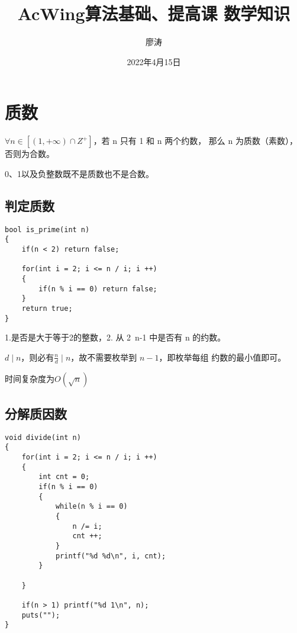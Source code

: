 \documentclass[]{book}
\title{AcWing算法基础、提高课 数学知识}
\author{廖涛}
\date{2022年4月15日}
\begin{document}


\maketitle
\tableofcontents

\chapter{质数}
$\forall n\in [(1, +\infty) \cap Z^+]$，若 n 只有 1 和 n 两个约数，
那么 n 为质数（素数），否则为合数。

0、1以及负整数既不是质数也不是合数。

\section{判定质数}
\begin{lstlisting}
bool is_prime(int n)
{
    if(n < 2) return false;

    for(int i = 2; i <= n / i; i ++)
    {
        if(n % i == 0) return false;
    }
    return true;
}
\end{lstlisting}

1.是否是大于等于2的整数，2. 从 2~n-1 中是否有 n 的约数。

$d \mid n$，则必有$\frac{n}{d} \mid n$，故不需要枚举到 $n - 1$，即枚举每组
约数的最小值即可。

时间复杂度为$O(\sqrt{n})$

\section{分解质因数}
\begin{lstlisting}
void divide(int n)
{
    for(int i = 2; i <= n / i; i ++)
    {   
        int cnt = 0;
        if(n % i == 0)
        {
            while(n % i == 0)
            {
                n /= i;
                cnt ++;
            }
            printf("%d %d\n", i, cnt);
        }
        
    }
    
    if(n > 1) printf("%d 1\n", n);
    puts("");
}
\end{lstlisting}
\end{document}
